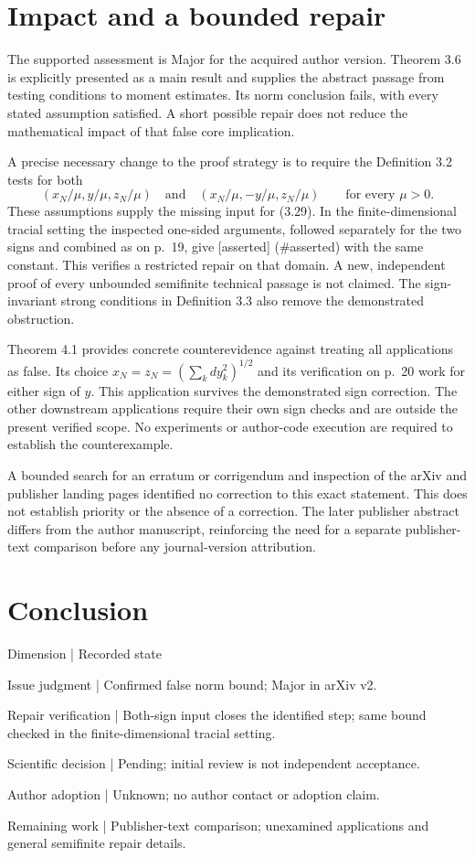 \documentclass[10pt]{article}
\begin{document}
\section*{Impact and a bounded repair}
The supported assessment is Major for the acquired author version. Theorem 3.6 is explicitly presented as a main result and supplies the abstract passage from testing conditions to moment estimates. Its norm conclusion fails, with every stated assumption satisfied. A short possible repair does not reduce the mathematical impact of that false core implication.\par
A precise necessary change to the proof strategy is to require the Definition 3.2 tests for both \[(x_N/\mu,y/\mu,z_N/\mu)
 \quad\text{and}\quad
 (x_N/\mu,-y/\mu,z_N/\mu)
 \qquad\text{for every }\mu>0.\] These assumptions supply the missing input for (3.29). In the finite-dimensional tracial setting the inspected one-sided arguments, followed separately for the two signs and combined as on p. 19, give [asserted] (\#asserted) with the same constant. This verifies a restricted repair on that domain. A new, independent proof of every unbounded semifinite technical passage is not claimed. The sign-invariant strong conditions in Definition 3.3 also remove the demonstrated obstruction.\par
Theorem 4.1 provides concrete counterevidence against treating all applications as false. Its choice \(x_N=z_N=(\sum_kdy_k^2)^{1/2}\) and its verification on p. 20 work for either sign of \(y\). This application survives the demonstrated sign correction. The other downstream applications require their own sign checks and are outside the present verified scope. No experiments or author-code execution are required to establish the counterexample.\par
A bounded search for an erratum or corrigendum and inspection of the arXiv and publisher landing pages identified no correction to this exact statement. This does not establish priority or the absence of a correction. The later publisher abstract differs from the author manuscript, reinforcing the need for a separate publisher-text comparison before any journal-version attribution.\par
\section*{Conclusion}
Dimension | Recorded state\par
Issue judgment | Confirmed false norm bound; Major in arXiv v2.\par
Repair verification | Both-sign input closes the identified step; same bound checked in the finite-dimensional tracial setting.\par
Scientific decision | Pending; initial review is not independent acceptance.\par
Author adoption | Unknown; no author contact or adoption claim.\par
Remaining work | Publisher-text comparison; unexamined applications and general semifinite repair details.\par
\end{document}
